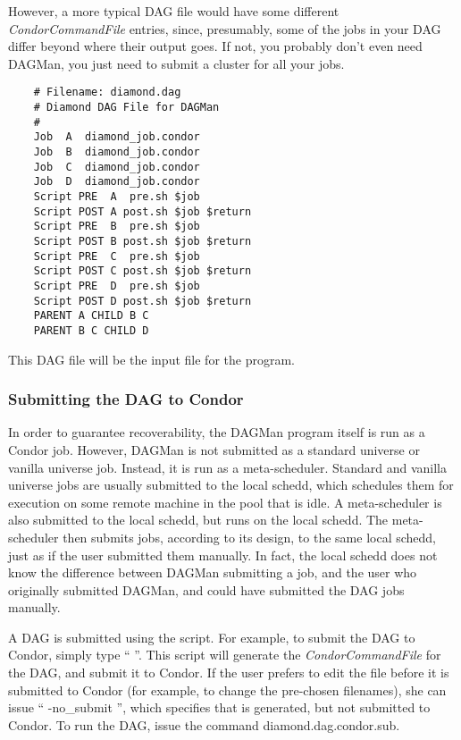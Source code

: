 However, a more typical DAG file would have some different 
\textit{CondorCommandFile} entries, since, presumably, some of the
jobs in your DAG differ beyond where their output goes.
If not, you probably don't even need DAGMan, you just need to submit a
cluster for all your jobs.

\begin{verbatim}
	# Filename: diamond.dag
	# Diamond DAG File for DAGMan
	#
	Job  A  diamond_job.condor
	Job  B  diamond_job.condor
	Job  C  diamond_job.condor
	Job  D  diamond_job.condor
	Script PRE  A  pre.sh $job
	Script POST A post.sh $job $return
	Script PRE  B  pre.sh $job
	Script POST B post.sh $job $return
	Script PRE  C  pre.sh $job
	Script POST C post.sh $job $return
	Script PRE  D  pre.sh $job
	Script POST D post.sh $job $return
	PARENT A CHILD B C
	PARENT B C CHILD D
\end{verbatim}

This DAG file will be the input file for the  program.

\subsubsection{\label{dagman:submitdag}Submitting the DAG to Condor}

In order to guarantee recoverability, the DAGMan program itself is run as a
Condor job.  However, DAGMan is not submitted as a standard universe or
vanilla universe job.  Instead, it is run as a meta-scheduler.  Standard and
vanilla universe jobs are usually submitted to the local schedd, which
schedules them for execution on some remote machine in the pool that is idle.
A meta-scheduler is also submitted to the local schedd, but runs on the local
schedd.  The meta-scheduler then submits jobs, according to its design, to the
same local schedd, just as if the user submitted them manually.  In fact, the
local schedd does not know the difference between DAGMan submitting a job, and
the user who originally submitted DAGMan, and could have submitted the DAG
jobs manually.

A DAG is submitted using the  script.  For
example, to submit the  DAG to Condor, simply type
`` ''.
This script will generate the 
\textit{CondorCommandFile} for the DAG, and submit it to Condor.
If the user prefers to edit the  file before
it is submitted to Condor (for example, to change the pre-chosen
filenames), she can issue `` -no\_submit
'', which specifies that 
is generated, but not submitted to Condor.
To run the DAG, issue the command 
diamond.dag.condor.sub. 

